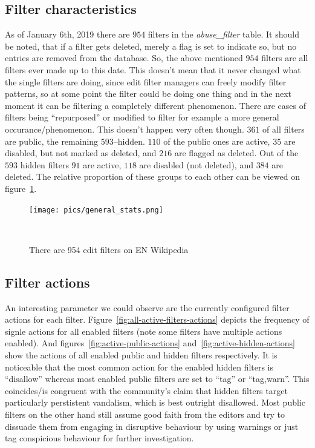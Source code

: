 \subsection{Filter characteristics}
As of January 6th, 2019 there are $954$ filters in the \emph{abuse\_filter} table.
It should be noted, that if a filter gets deleted, merely a flag is set to indicate so, but no entries are removed from the database.
So, the above mentioned $954$ filters are all filters ever made up to this date.
This doesn't mean that it never changed what the single filters are doing, since edit filter managers can freely modify filter patterns, so at some point the filter could be doing one thing and in the next moment it can be filtering a completely different phenomenon.
There are cases of filters being ``repurposed'' or modified to filter for example a more general occurance/phenomenon.
This doesn't happen very often though.
$361$ of all filters are public, the remaining $593$–hidden.
$110$ of the public ones are active, $35$ are disabled, but not marked as deleted, and $216$ are flagged as deleted.
Out of the $593$ hidden filters $91$ are active, $118$ are disabled (not deleted), and $384$ are deleted.
The relative proportion of these groups to each other can be viewed on figure~\ref{fig:general-stats}.

\begin{figure}
\centering
  \texttt{[image: pics/general\_stats.png]}
  \caption{There are 954 edit filters on EN Wikipedia}~\label{fig:general-stats}
\end{figure}

\subsection{Filter actions}
An interesting parameter we could observe are the currently configured filter actions for each filter.
Figure~\ref{fig:all-active-filters-actions} depicts the frequency of signle actions for all enabled filters (note some filters have multiple actions enabled).
And figures~\ref{fig:active-public-actions} and~\ref{fig:active-hidden-actions} show the actions of all enabled public and hidden filters respectively.
It is noticeable that the most common action for the enabled hidden filters is ``disallow'' whereas most enabled public filters are set to ``tag'' or ``tag,warn''.
This coincides/is congruent with the community's claim that hidden filters target particularly perstistent vandalism, which is best outright disallowed.
Most public filters on the other hand still assume good faith from the editors and try to dissuade them from engaging in disruptive behaviour by using warnings or just tag conspicious behaviour for further investigation.


